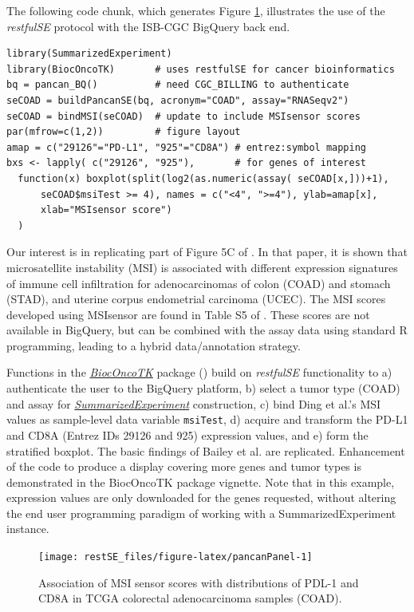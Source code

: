 \documentclass[9pt,a4paper,]{extarticle}
\begin{document}
The following code chunk, which generates
Figure \ref{fig:pancanPanel}, illustrates the
use of the \textit{restfulSE} protocol
with the ISB-CGC BigQuery back end.

\begin{verbatim}
library(SummarizedExperiment)
library(BiocOncoTK)       # uses restfulSE for cancer bioinformatics
bq = pancan_BQ()          # need CGC_BILLING to authenticate
seCOAD = buildPancanSE(bq, acronym="COAD", assay="RNASeqv2")
seCOAD = bindMSI(seCOAD)  # update to include MSIsensor scores
par(mfrow=c(1,2))         # figure layout 
amap = c("29126"="PD-L1", "925"="CD8A") # entrez:symbol mapping
bxs <- lapply( c("29126", "925"),       # for genes of interest
  function(x) boxplot(split(log2(as.numeric(assay( seCOAD[x,]))+1), 
      seCOAD$msiTest >= 4), names = c("<4", ">=4"), ylab=amap[x],
      xlab="MSIsensor score")
  )
\end{verbatim}

Our interest is in replicating part of
Figure 5C
of \citet{Bailey2018}. In that paper, it is shown that
microsatellite instability (MSI) is associated with
different expression signatures of immune cell infiltration
for adenocarcinomas of colon (COAD) and stomach (STAD), and
uterine corpus endometrial carcinoma (UCEC).
The MSI scores developed using MSIsensor are found
in Table S5 of \citet{Ding2018}. These scores are not available
in BigQuery, but can be combined with the assay data
using standard R programming, leading to a hybrid
data/annotation strategy.

Functions in the \emph{\href{https://bioconductor.org/packages/3.9/BiocOncoTK}{BiocOncoTK}}
package (\citet{bionc}) build on
\textit{restfulSE} functionality to a) authenticate the
user to the BigQuery platform, b) select a tumor
type (COAD) and assay for \emph{\href{https://bioconductor.org/packages/3.9/SummarizedExperiment}{SummarizedExperiment}}
construction, c) bind Ding et al.'s MSI values as
sample-level data variable \texttt{msiTest}, d)
acquire and transform the PD-L1 and CD8A
(Entrez IDs 29126 and 925)
expression values, and e) form the stratified boxplot.
The basic findings of Bailey et al. are replicated.
Enhancement of the code to produce a display covering
more genes and tumor types
is demonstrated in the BiocOncoTK package vignette.
Note that in this example, expression values are
only downloaded for the genes requested, without altering
the end user programming paradigm of working with
a SummarizedExperiment instance.

\begin{figure}[h]

{\centering \texttt{[image: restSE\_files/figure-latex/pancanPanel-1]} 

}

\caption{Association of MSI sensor scores with distributions of PDL-1 and CD8A in TCGA colorectal adenocarcinoma samples (COAD).}\label{fig:pancanPanel}
\end{figure}
\end{document}
